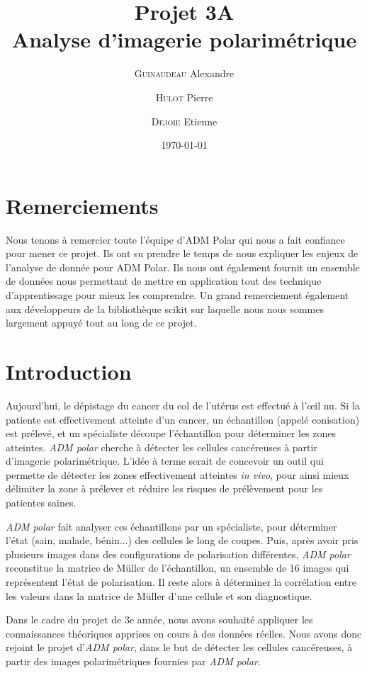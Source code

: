 \documentclass[a4paper,10pt]{report}
\title{Projet 3A\\Analyse d'imagerie polarimétrique}
\author{\textsc{Guinaudeau} Alexandre\\
	\and 
	\textsc{Hulot} Pierre
	\and 
	\textsc{Dejoie} Etienne	
	}
\date{\today}
\begin{document}
\maketitle
\chapter*{Remerciements}
Nous tenons à remercier toute l'équipe d'ADM Polar qui nous a fait confiance pour mener ce projet. Ils ont su prendre le temps de nous expliquer les enjeux de l'analyse de donnée pour ADM Polar. Ils nous ont également fournit un ensemble de données nous permettant de mettre en application tout des technique d'apprentissage pour mieux les comprendre.
Un grand remerciement également aux développeurs de la bibliothèque scikit sur laquelle nous nous sommes largement appuyé tout au long de ce projet.

\chapter*{Introduction}

Aujourd'hui, le dépistage du cancer du col de l'utérus est effectué à l'\oe il nu. Si la patiente est effectivement atteinte d'un cancer, un échantillon (appelé conisation) est prélevé, et un spécialiste découpe l'échantillon pour déterminer les zones atteintes. \emph{ADM polar} cherche à détecter les cellules cancéreuses à partir d'imagerie polarimétrique. 
L'idée à terme serait de concevoir un outil qui permette de détecter les zones effectivement atteintes \emph{in vivo}, pour ainsi mieux délimiter la zone à prélever et réduire les risques de prélèvement pour les patientes saines.

\emph{ADM polar} fait analyser ces échantillons par un spécialiste, pour déterminer l'état (sain, malade, bénin...) des cellules le long de coupes.
Puis, après avoir pris plusieurs images dans des configurations de polarisation différentes, \emph{ADM polar} reconstitue la matrice de Müller de l'échantillon, un ensemble de 16 images qui représentent l'état de polarisation.
Il reste alors à déterminer la corrélation entre les valeurs dans la matrice de Müller d'une cellule et son diagnostique.

Dans le cadre du projet de 3e année, nous avons souhaité appliquer les connaissances théoriques apprises en cours à des données réelles. Nous avons donc rejoint le projet d'\emph{ADM polar}, dans le but de détecter les cellules cancéreuses, à partir des images polarimétriques fournies par \emph{ADM polar}.
\end{document}
